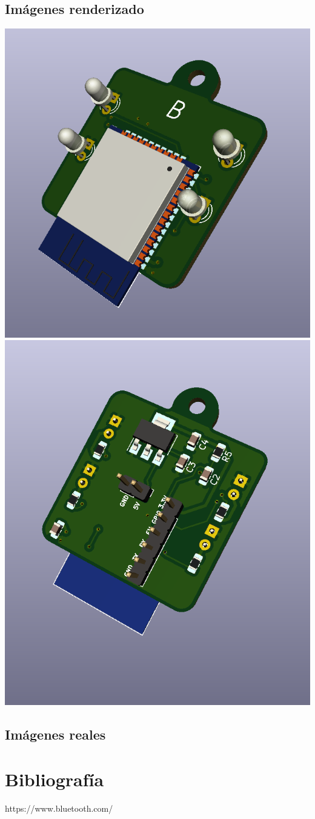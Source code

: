 \documentclass[a4paper ,12pt, onecolumn]{article}
\begin{document}
    \subsection{Imágenes renderizado}
        \includegraphics[scale=0.4]{../emiter_1.PNG}
        \includegraphics[scale=0.4]{../emiter_2.PNG}
    \subsection{Imágenes reales}

\section{Bibliografía}
https://www.bluetooth.com/
\end{document}
